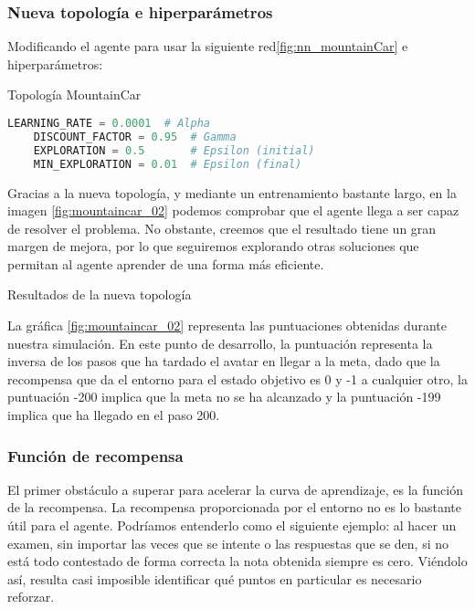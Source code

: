 \subsubsection{Nueva topología e hiperparámetros}

Modificando el agente para usar la siguiente red\ref{fig:nn_mountainCar} e hiperparámetros:

%
       {Topología MountainCar}

\begin{minipage}{0.9\linewidth}%
    \begin{lstlisting}[frame=tb, language=Python, caption=Hiperparámetros MountainCar, label=code:cartpole_drl]
    LEARNING_RATE = 0.0001  # Alpha
    DISCOUNT_FACTOR = 0.95  # Gamma
    EXPLORATION = 0.5       # Epsilon (initial)
    MIN_EXPLORATION = 0.01  # Epsilon (final)
    \end{lstlisting}%
\end{minipage}

Gracias a la nueva topología, y mediante un entrenamiento bastante largo, en la imagen \ref{fig:mountaincar_02} podemos comprobar que el agente llega a ser capaz de resolver el problema. No obstante, creemos que el resultado tiene un gran margen de mejora, por lo que seguiremos explorando otras soluciones que permitan al agente aprender de una forma más eficiente.

%
       {Resultados de la nueva topología}

La gráfica \ref{fig:mountaincar_02} representa las puntuaciones obtenidas durante nuestra simulación. En este punto de desarrollo, la puntuación representa la inversa de los pasos que ha tardado el avatar en llegar a la meta, dado que la recompensa que da el entorno para el estado objetivo es 0 y -1 a cualquier otro, la puntuación -200 implica que la meta no se ha alcanzado y la puntuación -199 implica que ha llegado en el paso 200. 

\subsubsection{Función de recompensa}

El primer obstáculo a superar para acelerar la curva de aprendizaje, es la función de la recompensa. La recompensa proporcionada por el entorno no es lo bastante útil para el agente. Podríamos entenderlo como el siguiente ejemplo: al hacer un examen, sin importar las veces que se intente o las respuestas que se den, si no está todo contestado de forma correcta la nota obtenida siempre es cero. Viéndolo así, resulta casi imposible identificar qué puntos en particular es necesario reforzar.

